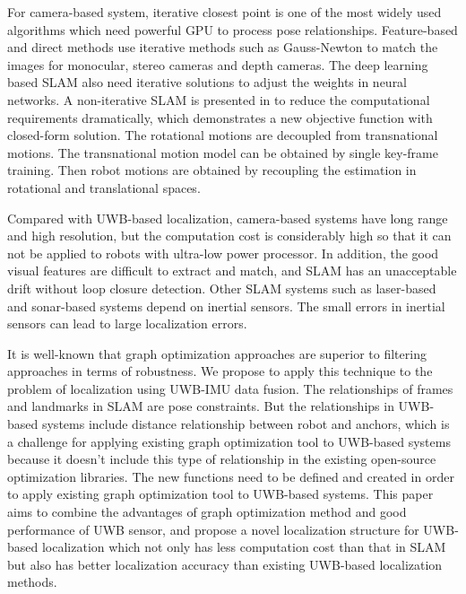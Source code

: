 \documentclass[journal]{IEEEtran}
\begin{document}
For camera-based system, iterative closest point is one of the most widely used algorithms which need powerful GPU to process pose relationships. Feature-based \cite{Whelan:2017fn, Newcombe:2015us} and direct methods \cite{Forster:2014ts, MurArtal:2015iua} use iterative methods such as Gauss-Newton to match the images for monocular, stereo cameras and depth cameras. The deep learning based SLAM \cite{Tateno:2017tv, DeTone:2017wk} also need iterative solutions to adjust the weights in neural networks. A non-iterative SLAM is presented in \cite{Wang:2017tx} to reduce the computational requirements dramatically, which demonstrates a new objective function with closed-form solution. The rotational motions are decoupled from transnational motions. The transnational motion model can be obtained by single key-frame training. Then robot motions are obtained by recoupling the estimation in rotational and translational spaces. 

Compared with UWB-based localization, camera-based systems have long range and high resolution, but \cite{Aulinas:2008wj} the computation cost is considerably high so that it can not be applied to robots with ultra-low power processor. In addition, the good visual features are difficult to extract and match, and SLAM has an unacceptable drift without loop closure detection. Other SLAM systems such as laser-based and sonar-based systems depend on inertial sensors. The small errors in inertial sensors can lead to large localization errors. 

It is well-known that graph optimization approaches are superior to filtering approaches in terms of robustness. We propose to apply this technique to the problem of localization using UWB-IMU data fusion. The relationships of frames and landmarks in SLAM are pose constraints. But the relationships in UWB-based systems include distance relationship between robot and anchors, which is a challenge for applying existing graph optimization tool to UWB-based systems because it doesn't include this type of relationship in the existing open-source optimization libraries. The new functions need to be defined and created in order to apply existing graph optimization tool to UWB-based systems. This paper aims to combine the advantages of graph optimization method and good performance of UWB sensor, and propose a novel localization structure for UWB-based localization which not only has less computation cost than that in SLAM but also has better localization accuracy than existing UWB-based localization methods.
\end{document}
